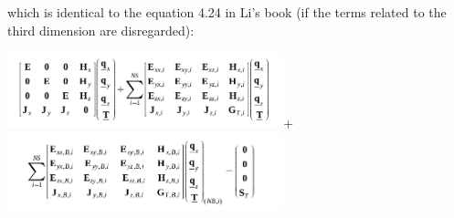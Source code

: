 \begin{landscape}
which is identical to the equation 4.24 in Li's book (if the terms related to the third dimension are disregarded):
\begin{center}
\includegraphics[width=8cm]{images/dgfem/li_04}+
\includegraphics[width=8cm]{images/dgfem/li_05}
\end{center}
\end{landscape}

